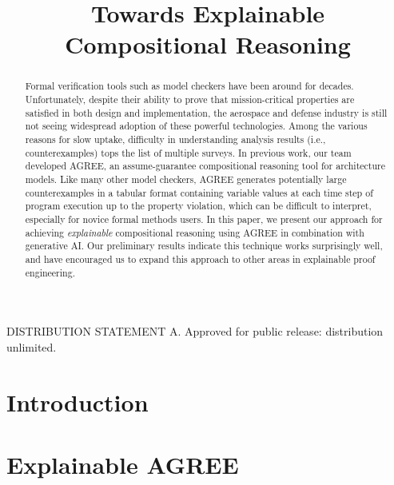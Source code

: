 \documentclass[conference]{IEEEtran}
\begin{document}
\title{Towards Explainable Compositional Reasoning}

\author{
	}



\maketitle

\begin{abstract}

Formal verification tools such as model checkers have been around for decades.  Unfortunately, despite their ability to prove that mission-critical properties are satisfied in both design and implementation, the aerospace and defense industry is still not seeing widespread adoption of these powerful technologies. 
%
Among the various reasons for slow uptake, difficulty in understanding analysis results (i.e., counterexamples) tops the list of multiple surveys.
%
In previous work, our team developed AGREE, an assume-guarantee compositional reasoning tool for architecture models.  Like many other model checkers, AGREE generates potentially large counterexamples in a tabular format containing variable values at each time step of program execution up to the property violation, which can be difficult to interpret, especially for novice formal methods users.
In this paper, we present our approach for achieving \textit{explainable} compositional reasoning using AGREE in combination with generative AI.  Our preliminary results indicate this technique works surprisingly well, and have encouraged us to expand this approach to other areas in explainable proof engineering.  
	

\end{abstract}

\vspace{12pt}
DISTRIBUTION STATEMENT A. Approved for public release: distribution unlimited.

\section{Introduction}
\label{sec:introduction}


\section{Explainable AGREE}
\label{sec:agree}

\end{document}
